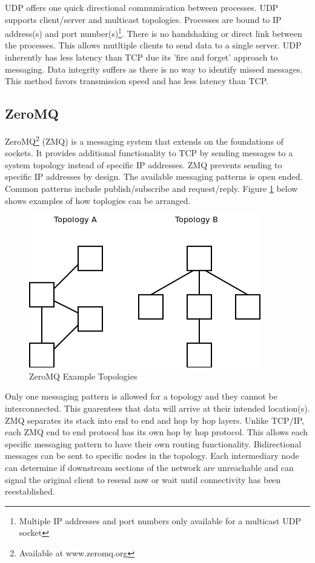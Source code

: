 UDP offers one quick directional communication between processes. UDP supports client/server and multicast topologies. Processes are bound to IP address(s) and port number(s)\footnote{Multiple IP addresses and port numbers only available for a multicast UDP socket}. There is no handshaking or direct link between the processes. This allows mutltiple clients to send data to a single server. UDP inherently has less latency than TCP due its 'fire and forget' approach to messaging. Data integrity suffers as there is no way to identify missed messages. This method favors transmission speed and has less latency than TCP.

\subsection{ZeroMQ}

ZeroMQ\footnote{Available at www.zeromq.org} (ZMQ) is a messaging system that extends on the foundations of sockets. It provides additional functionality to TCP by sending messages to a system topology instead of specific IP addresses. ZMQ prevents sending to specific IP addresses by design. The available messaging patterns is open ended. Common patterns include publish/subscribe and request/reply. Figure \ref{fig:zmq top} below shows examples of how toplogies can be arranged.

\begin{figure}[thpb]
 \centering
 \includegraphics[width=1.0\columnwidth]{./images/zmqtopology.png}
  \caption{ZeroMQ Example Topologies}
  \label{fig:zmq top}
\end{figure} 

Only one messaging pattern is allowed for a topology and they cannot be interconnected. This guarentees that data will arrive at their intended location(s). ZMQ separates its stack into end to end and hop by hop layers. Unlike TCP/IP, each ZMQ end to end protocol has its own hop by hop protocol\cite{ZMQTHEORY}. This allows each specific messaging pattern to have their own routing functionality. Bidirectional messages can be sent to specific nodes in the topology. Each intermediary node can determine if downstream sections of the network are unreachable and can signal the original client to resend now or wait until connectivity has been reestablished. 

